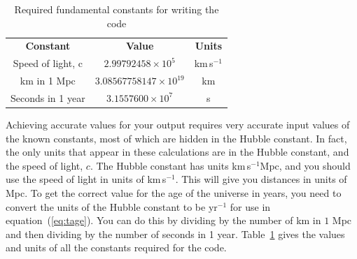 \documentclass[]{article}
\begin{document}
\begin{table}
\caption{Required fundamental constants for writing the code}
\centering
\label{table:constants}
\begin{tabular}{c c c}
\\ [0.05ex]
\hline
\textbf{Constant} & \textbf{Value} & \textbf{Units} \\ [0.5ex]
Speed of light, c & $2.99792458\times 10^5$ & km$\,$s$^{-1}$\\
km in 1 Mpc & $3.08567758147\times 10^{19}$ & km\\
Seconds in 1 year & $3.1557600\times 10^7$ & s\\
\hline
\end{tabular}
\end{table}

\noindent Achieving accurate values for your output requires very accurate input values of the known constants, most of which are hidden in the Hubble constant. In fact, the only units that appear in these calculations are in the Hubble constant, and the speed of light, $c$. The Hubble constant has units km$\,$s$^{-1}$Mpc, and you should use the speed of light in units of km$\,$s$^{-1}$. This will give you distances in units of Mpc. To get the correct value for the age of the universe in years, you need to convert the units of the Hubble constant to be yr$^{-1}$ for use in equation~(\ref{eq:tage}). You can do this by dividing by the number of km in $1$ Mpc and then dividing by the number of seconds in 1 year.  Table~\ref{table:constants} gives the values and units of all the constants required for the code. 
\end{document}

